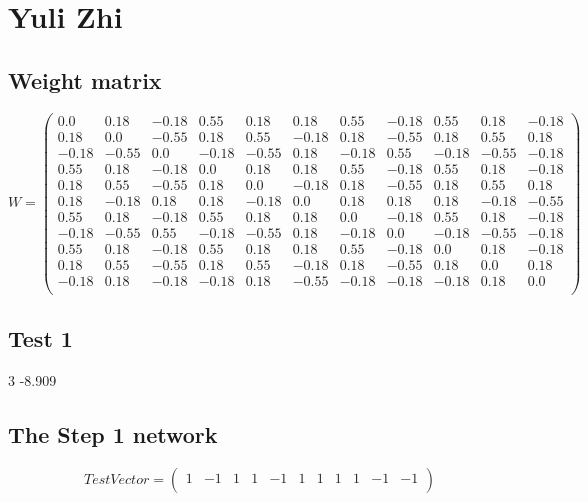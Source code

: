 \documentclass[a4paper,fontsize=12pt]{scrartcl}
\begin{document}
\section*{Yuli Zhi}
\subsection*{Weight matrix}
$$ W=\left(\begin{array}{ccccccccccc}
0.0&0.18&-0.18&0.55&0.18&0.18&0.55&-0.18&0.55&0.18&-0.18\\0.18&0.0&-0.55&0.18&0.55&-0.18&0.18&-0.55&0.18&0.55&0.18\\-0.18&-0.55&0.0&-0.18&-0.55&0.18&-0.18&0.55&-0.18&-0.55&-0.18\\0.55&0.18&-0.18&0.0&0.18&0.18&0.55&-0.18&0.55&0.18&-0.18\\0.18&0.55&-0.55&0.18&0.0&-0.18&0.18&-0.55&0.18&0.55&0.18\\0.18&-0.18&0.18&0.18&-0.18&0.0&0.18&0.18&0.18&-0.18&-0.55\\0.55&0.18&-0.18&0.55&0.18&0.18&0.0&-0.18&0.55&0.18&-0.18\\-0.18&-0.55&0.55&-0.18&-0.55&0.18&-0.18&0.0&-0.18&-0.55&-0.18\\0.55&0.18&-0.18&0.55&0.18&0.18&0.55&-0.18&0.0&0.18&-0.18\\0.18&0.55&-0.55&0.18&0.55&-0.18&0.18&-0.55&0.18&0.0&0.18\\-0.18&0.18&-0.18&-0.18&0.18&-0.55&-0.18&-0.18&-0.18&0.18&0.0\\\end{array}\right)$$
\subsection*{Test 1}
3
 -8.909 \qquad
 \subsection*{The Step  1 network}
$$ Test Vector=\left(\begin{array}{ccccccccccc}
1&-1&1&1&-1&1&1&1&1&-1&-1\\\end{array}\right)$$
\end{document}
